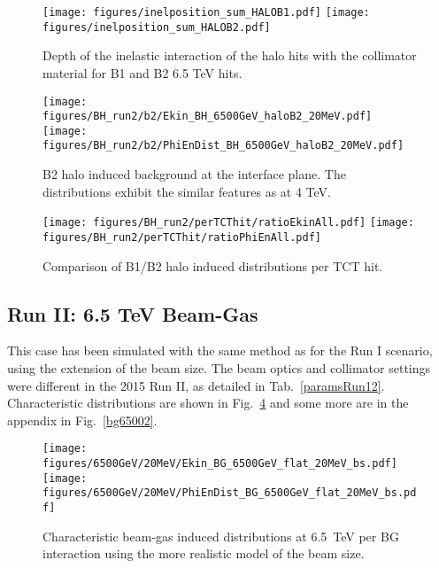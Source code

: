 \begin{figure}[!htb]
\begin{center}
\texttt{[image: figures/inelposition\_sum\_HALOB1.pdf]}
\texttt{[image: figures/inelposition\_sum\_HALOB2.pdf]}
\end{center}
 \caption{Depth of the inelastic interaction of the halo hits with the collimator material for B1 and B2 6.5 TeV hits.
  \label{inel6.5}}
\end{figure}


\begin{figure}%
\centering
\texttt{[image: figures/BH\_run2/b2/Ekin\_BH\_6500GeV\_haloB2\_20MeV.pdf]}
\texttt{[image: figures/BH\_run2/b2/PhiEnDist\_BH\_6500GeV\_haloB2\_20MeV.pdf]}

 \caption{B2 halo induced background at the interface plane. The distributions exhibit the similar features as at 4 TeV.
  \label{dist6500GeVB2}}
\end{figure}


\begin{figure}%
\centering
  \texttt{[image: figures/BH\_run2/perTCThit/ratioEkinAll.pdf]}
  \texttt{[image: figures/BH\_run2/perTCThit/ratioPhiEnAll.pdf]}

 \caption{Comparison of B1/B2 halo induced distributions per TCT hit.
  \label{compBHB1B2run2}}
\end{figure}



\subsection{Run II: 6.5 TeV Beam-Gas}

This case has been simulated with the same method as for the Run I scenario, using the extension of the beam size. The beam optics and collimator settings were different in the 2015 Run II, as detailed in Tab.~\ref{paramsRun12}. Characteristic distributions are shown in Fig.~\ref{bg6500} and some more are in the appendix in Fig.~\ref{bg65002}.

\begin{figure}%
\begin{center}
  \texttt{[image: figures/6500GeV/20MeV/Ekin\_BG\_6500GeV\_flat\_20MeV\_bs.pdf]}
  \texttt{[image: figures/6500GeV/20MeV/PhiEnDist\_BG\_6500GeV\_flat\_20MeV\_bs.pdf]}
\end{center}
\vspace{-0.6cm}
 \caption{Characteristic beam-gas induced distributions at 6.5~TeV per BG interaction using the more realistic model of the beam size.
  \label{bg6500}}
\end{figure}

